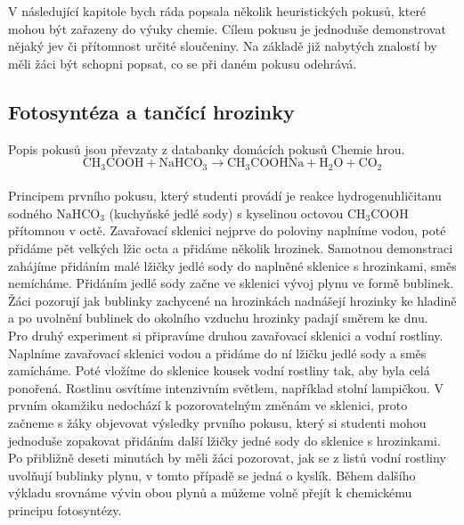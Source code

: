 V následující kapitole bych ráda popsala několik heuristických pokusů, které mohou být zařazeny do výuky chemie. Cílem pokusu je jednoduše demonstrovat nějaký jev či přítomnost určité sloučeniny. Na základě již nabytých znalostí by měli žáci být schopni popsat, co se při daném pokusu odehrává.\\

\subsection*{Fotosyntéza a tančící hrozinky}

Popis pokusů jsou převzaty z databanky domácích pokusů Chemie hrou. \cite{chemiehrou_tancici_hrozinky, chemiehrou_fotosynteza}\\
    
    \begin{equation}
        \mathrm{CH_{3}}\mathrm{COOH} + \mathrm{NaHCO_{3}} \rightarrow \mathrm{CH_{3}}\mathrm{COOHNa} + \mathrm{H_{2}O} + \mathrm{CO_{2}}
    \end{equation}\\

    
Principem prvního pokusu, který studenti provádí je reakce hydrogenuhličitanu sodného $\mathrm{NaHCO_{3}}$ (kuchyňské jedlé sody) s kyselinou octovou $\mathrm{CH_{3}COOH}$ přítomnou v octě. Zavařovací sklenici nejprve do poloviny naplníme vodou, poté přidáme pět velkých lžic octa a přidáme několik hrozinek. Samotnou demonstraci zahájíme přidáním malé lžičky jedlé sody do naplněné sklenice s hrozinkami, směs nemícháme. Přidáním jedlé sody začne ve sklenici vývoj plynu ve formě bublinek. Žáci pozorují jak bublinky zachycené na hrozinkách nadnášejí hrozinky ke hladině a po uvolnění bublinek do okolního vzduchu hrozinky padají směrem ke dnu. \\

Pro druhý experiment si připravíme druhou zavařovací sklenici a vodní rostliny. Naplníme zavařovací sklenici vodou a přidáme do ní lžičku jedlé sody a směs zamícháme. Poté vložíme do sklenice kousek vodní rostliny tak, aby byla celá ponořená. Rostlinu osvítíme intenzivním světlem, například stolní lampičkou. V prvním okamžiku nedochází k pozorovatelným změnám ve sklenici, proto začneme s žáky objevovat výsledky prvního pokusu, který si studenti mohou jednoduše zopakovat přidáním další lžičky jedné sody do sklenice s hrozinkami. \\

Po přibližně deseti minutách by měli žáci pozorovat, jak se z listů vodní rostliny uvolňují bublinky plynu, v tomto případě se jedná o kyslík. Během dalšího výkladu srovnáme vývin obou plynů a můžeme volně přejít k chemickému principu fotosyntézy.\cite{prirodovedci_fotosynteza}\\


